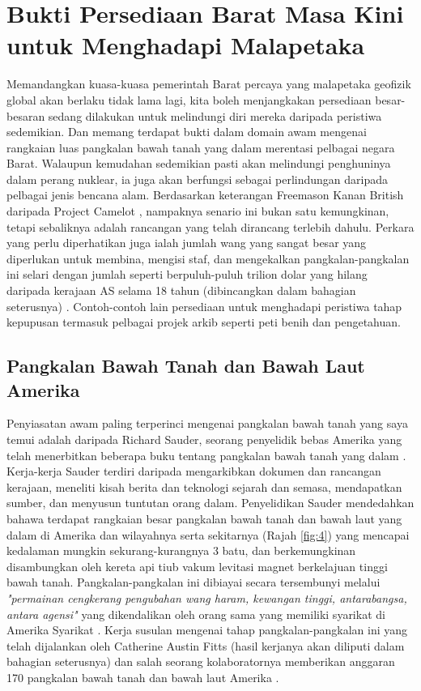 \documentclass[10pt,twocolumn,letterpaper]{article}
\begin{document}
\section{Bukti Persediaan Barat Masa Kini untuk Menghadapi Malapetaka}

Memandangkan kuasa-kuasa pemerintah Barat percaya yang malapetaka geofizik global akan berlaku tidak lama lagi, kita boleh menjangkakan persediaan besar-besaran sedang dilakukan untuk melindungi diri mereka daripada peristiwa sedemikian. Dan memang terdapat bukti dalam domain awam mengenai rangkaian luas pangkalan bawah tanah yang dalam merentasi pelbagai negara Barat. Walaupun kemudahan sedemikian pasti akan melindungi penghuninya dalam perang nuklear, ia juga akan berfungsi sebagai perlindungan daripada pelbagai jenis bencana alam. Berdasarkan keterangan Freemason Kanan British daripada Project Camelot \cite{4,6}, nampaknya senario ini bukan satu kemungkinan, tetapi sebaliknya adalah rancangan yang telah dirancang terlebih dahulu. Perkara yang perlu diperhatikan juga ialah jumlah wang yang sangat besar yang diperlukan untuk membina, mengisi staf, dan mengekalkan pangkalan-pangkalan ini selari dengan jumlah seperti berpuluh-puluh trilion dolar yang hilang daripada kerajaan AS selama 18 tahun (dibincangkan dalam bahagian seterusnya) \cite{11,12,13}. Contoh-contoh lain persediaan untuk menghadapi peristiwa tahap kepupusan termasuk pelbagai projek arkib seperti peti benih dan pengetahuan.
\subsection{Pangkalan Bawah Tanah dan Bawah Laut Amerika}

Penyiasatan awam paling terperinci mengenai pangkalan bawah tanah yang saya temui adalah daripada Richard Sauder, seorang penyelidik bebas Amerika yang telah menerbitkan beberapa buku tentang pangkalan bawah tanah yang dalam \cite{22}. Kerja-kerja Sauder terdiri daripada mengarkibkan dokumen dan rancangan kerajaan, meneliti kisah berita dan teknologi sejarah dan semasa, mendapatkan sumber, dan menyusun tuntutan orang dalam. Penyelidikan Sauder mendedahkan bahawa terdapat rangkaian besar pangkalan bawah tanah dan bawah laut yang dalam di Amerika dan wilayahnya serta sekitarnya (Rajah \ref{fig:4}) yang mencapai kedalaman mungkin sekurang-kurangnya 3 batu, dan berkemungkinan disambungkan oleh kereta api tiub vakum levitasi magnet berkelajuan tinggi bawah tanah. Pangkalan-pangkalan ini dibiayai secara tersembunyi melalui \textit{"permainan cengkerang pengubahan wang haram, kewangan tinggi, antarabangsa, antara agensi"} yang dikendalikan oleh orang sama yang memiliki syarikat di Amerika Syarikat \cite{22}. Kerja susulan mengenai tahap pangkalan-pangkalan ini yang telah dijalankan oleh Catherine Austin Fitts (hasil kerjanya akan diliputi dalam bahagian seterusnya) dan salah seorang kolaboratornya memberikan anggaran 170 pangkalan bawah tanah dan bawah laut Amerika \cite{16,20}.
\end{document}
